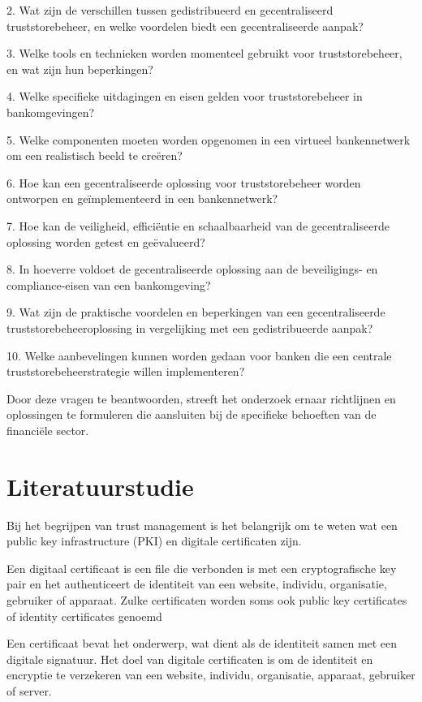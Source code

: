 2. Wat zijn de verschillen tussen gedistribueerd en gecentraliseerd truststorebeheer, en welke voordelen biedt een gecentraliseerde aanpak?

3. Welke tools en technieken worden momenteel gebruikt voor truststorebeheer, en wat zijn hun beperkingen?

4. Welke specifieke uitdagingen en eisen gelden voor truststorebeheer in bankomgevingen?

5. Welke componenten moeten worden opgenomen in een virtueel bankennetwerk om een realistisch beeld te creëren?

6. Hoe kan een gecentraliseerde oplossing voor truststorebeheer worden ontworpen en geïmplementeerd in een bankennetwerk?

7. Hoe kan de veiligheid, efficiëntie en schaalbaarheid van de gecentraliseerde oplossing worden getest en geëvalueerd?

8. In hoeverre voldoet de gecentraliseerde oplossing aan de beveiligings- en compliance-eisen van een bankomgeving?

9. Wat zijn de praktische voordelen en beperkingen van een gecentraliseerde truststorebeheeroplossing in vergelijking met een gedistribueerde aanpak?

10. Welke aanbevelingen kunnen worden gedaan voor banken die een centrale truststorebeheerstrategie willen implementeren?

Door deze vragen te beantwoorden, streeft het onderzoek ernaar richtlijnen en oplossingen te formuleren die aansluiten bij de specifieke behoeften van de financiële sector.


\section{Literatuurstudie}%
\label{sec:literatuurstudie}

Bij het begrijpen van trust management is het belangrijk om te weten wat een public key infrastructure (PKI) en digitale certificaten zijn.

Een digitaal certificaat is een file die verbonden is met een cryptografische key pair en het authenticeert de identiteit van een website, individu, organisatie, gebruiker of apparaat. Zulke certificaten worden soms ook public key certificates of identity certificates genoemd

Een certificaat bevat het onderwerp, wat dient als de identiteit samen met een digitale signatuur. Het doel van digitale certificaten is om de identiteit en encryptie te verzekeren van een website, individu, organisatie, apparaat, gebruiker of server. \autocite{Digicert}

